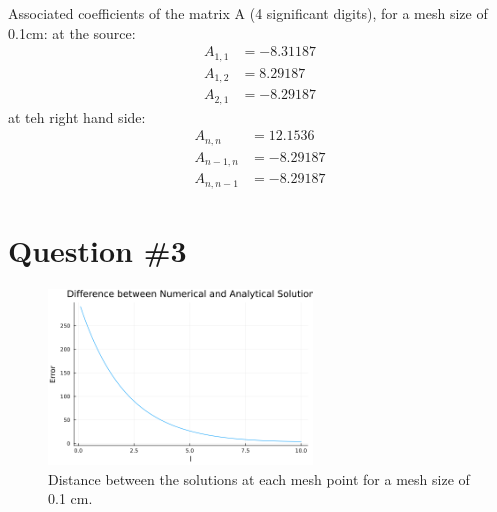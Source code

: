 \documentclass[11pt,a4paper]{article}
\begin{document}


Associated coefficients of the matrix A (4 significant digits), for a mesh size of 0.1cm:
at the source:
\begin{align}
    A_{1, 1}     &=   -8.31187\\
    A_{1, 2}     &=    8.29187\\
    A_{2, 1}     &=   -8.29187
\end{align}
at teh right hand side:
\begin{align}
    A_{n, n}     &= 12.1536\\
    A_{n - 1, n} &=  -8.29187\\
    A_{n, n - 1} &=  -8.29187
\end{align}

\section{Question \#3}
\begin{figure}[h]
\includegraphics[width=7cm]{../figs/ex1/ex1_err_100.png}
\centering
\caption{Distance between the solutions at each mesh point for a mesh size of 0.1 cm.}
\end{figure}
\end{document}
